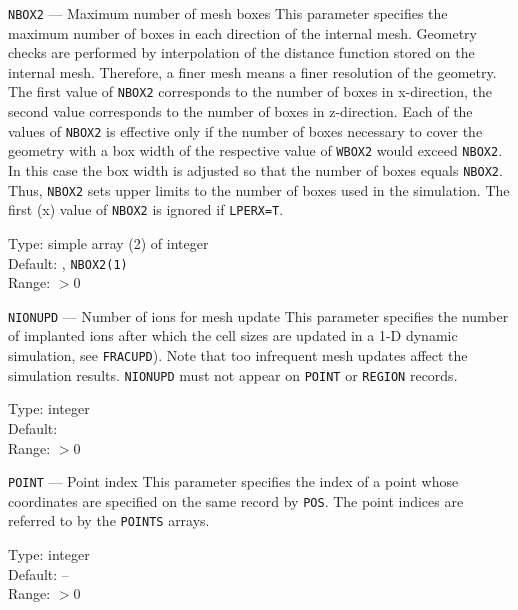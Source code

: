 \begin{keydescription}{\texttt{NBOX2} --- Maximum number of mesh boxes}
%
  This parameter specifies the maximum number of boxes in each direction 
  of the internal mesh. Geometry checks are performed by interpolation of the 
  distance function stored on the internal mesh. Therefore, a finer mesh means 
  a finer resolution of the geometry. The first value of \texttt{NBOX2} 
  corresponds to the number of boxes in x-direction, the second value 
  corresponds to the number of boxes in z-direction. Each of the values of 
  \texttt{NBOX2} is effective only if the number of boxes necessary to cover 
  the geometry with a box width of the respective value of \texttt{WBOX2} 
  would exceed \texttt{NBOX2}. In this case the box width is adjusted so that 
  the number of boxes equals \texttt{NBOX2}. Thus, \texttt{NBOX2} sets upper 
  limits to the number of boxes used in the simulation. The first (x) value of 
  \texttt{NBOX2} is ignored if \texttt{LPERX=T}.
  \begin{keytab}
    Type:    \> simple array (2) of integer \\
    Default: , \texttt{NBOX2(1)} \\
    Range:   \> $> 0$
  \end{keytab}
\end{keydescription}

\begin{keydescription}{\texttt{NIONUPD} --- Number of ions for mesh update}
%
  This parameter specifies the number of implanted ions after which the
  cell sizes are updated in a 1-D dynamic simulation, see \texttt{FRACUPD}). 
  Note that too infrequent mesh updates affect the simulation results.
  \texttt{NIONUPD} must not appear on \texttt{POINT} or \texttt{REGION} records.  
  \begin{keytab}
    Type:    \> integer \\
    Default:  \\
    Range:   \> $> 0$
  \end{keytab}
\end{keydescription}

\begin{keydescription}{\texttt{POINT} --- Point index}
%
  This parameter specifies the index of a point whose coordinates are specified
  on the same record by \texttt{POS}. The point indices are referred to by the
  \texttt{POINTS} arrays. 
  \begin{keytab}
    Type:    \> integer \\
    Default: \> -- \\
    Range:   \> $>0$ 
  \end{keytab}
\end{keydescription}

